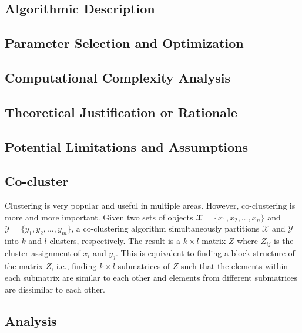 \subsection{Algorithmic Description}

\subsection{Parameter Selection and Optimization}

\subsection{Computational Complexity Analysis}

\subsection{Theoretical Justification or Rationale}

\subsection{Potential Limitations and Assumptions}
\subsection{Co-cluster}
Clustering is very popular and useful in multiple areas. However, co-clustering is more and more important.
Given two sets of objects $\mathcal{X} = \{x_1, x_2, \dots, x_n\}$ and $\mathcal{Y} = \{y_1, y_2, \dots, y_m\}$, a co-clustering algorithm simultaneously partitions $\mathcal{X}$ and $\mathcal{Y}$ into $k$ and $l$ clusters, respectively. The result is a $k \times l$ matrix $Z$ where $Z_{ij}$ is the cluster assignment of $x_i$ and $y_j$.
This is equivalent to finding a block structure of the matrix $Z$, i.e., finding $k \times l$ submatrices of $Z$ such that the elements within each submatrix are similar to each other and elements from different submatrices are dissimilar to each other.

\subsection{Analysis}

